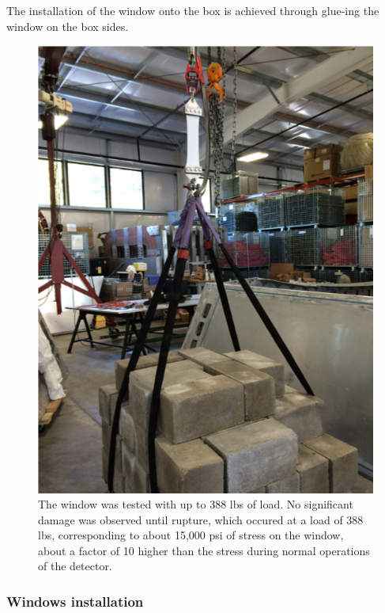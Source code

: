 The installation of the window onto the box is achieved through glue-ing the window on the box sides.


\begin{figure}
	\centering
	\includegraphics[width=1.0\columnwidth,keepaspectratio]{img/windowTest.png}
	\caption{The window was tested with up to 388 lbs of load. No significant damage was observed until rupture, which occured at a load of 388 lbs,
			   corresponding to about 15,000 psi of stress on the window, about a factor of 10 higher than the stress during normal operations of the detector.}
	\label{fig:windowTest}
\end{figure}



\subsubsection{Windows installation}

